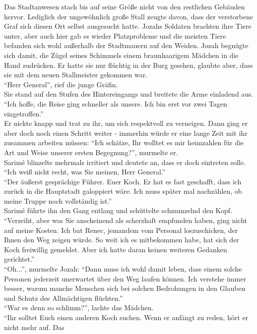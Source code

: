 Das Stadtanwesen stach bis auf seine Größe nicht von den restlichen Gebäuden hervor. Lediglich der 
ungewöhnlich große Stall zeugte davon, dass der verstorbene Graf sich diesen Ort selbst ausgesucht 
hatte. Jozahs Soldaten brachten ihre Tiere unter, aber auch hier gab es wieder Platzprobleme und 
die meisten Tiere befanden sich wohl außerhalb der Stadtmauern auf den Weiden. Jozah begnügte sich 
damit, die Zügel seines Schimmels einem braunhaarigem Mädchen in die Hand zudrücken. Er hatte sie 
nur flüchtig in der Burg gesehen, glaubte aber, dass sie mit dem neuen Stallmeister gekommen war.\\
``Herr General'', rief die junge Gräfin.\\
Sie stand auf den Stufen des Hintereingangs und breitete die Arme einladend aus. ``Ich hoffe, die 
Reise ging schneller als unsere. Ich bin erst vor zwei Tagen eingetroffen.''\\
Er nickte knapp und trat zu ihr, um sich respektvoll zu verneigen. Dann ging er aber doch noch 
einen Schritt weiter - immerhin würde er eine lange Zeit mit ihr zusammen arbeiten müssen: 
``Ich schätze, Ihr wolltet es mir heimzahlen für die Art und Weise unserer ersten Begegnung?'', 
murmelte er.\\
Sarimé blinzelte mehrmals irritiert und deutete an, dass er doch eintreten solle. ``Ich weiß nicht 
recht, was Sie meinen, Herr General.''\\
``Der äußerst gesprächige Führer. Euer Koch. Er hat es fast geschafft, dass ich zurück in die 
Hauptstadt galoppiert wäre. Ich muss später mal nachzählen, ob meine Truppe noch vollständig 
ist.''\\
Sarimé führte ihn den Gang entlang und schüttelte schmunzelnd den Kopf. ``Verzeiht, aber was Sie 
anscheinend als scherzhaft empfunden haben, ging nicht auf meine Kosten. Ich bat Renec, jemandem 
vom Personal loszuschicken, der Ihnen den Weg zeigen würde. So weit ich es mitbekommen habe, hat 
sich der Koch freiwillig gemeldet. Aber ich hatte daran keinen weiteren Gedanken gerichtet.''\\
``Oh...'', murmelte Jozah: ``Dann muss ich wohl damit leben, dass einem solche Personen jederzeit 
unerwartet über den Weg laufen können. Ich verstehe immer besser, warum manche Menschen sich bei 
solchen Bedrohungen in den Glauben und Schutz des Allmächtigen flüchten.''\\
``War es denn so schlimm?'', lachte das Mädchen.\\
``Ihr solltet Euch einen anderen Koch suchen. Wenn er anfängt zu reden, hört er nicht mehr auf. Das 
